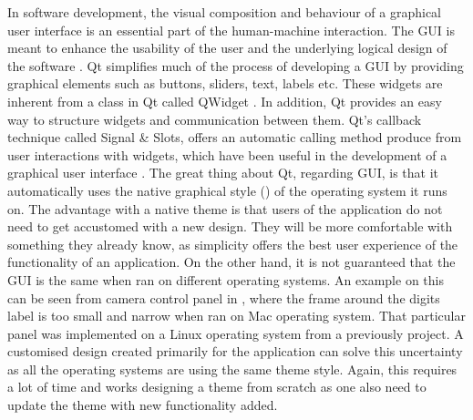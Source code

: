 In software development, the visual composition and behaviour of a graphical user interface is an essential part of the human-machine interaction. The GUI is meant to enhance the usability of the user and the underlying logical design of the software \cite{gui}. Qt simplifies much of the process of developing a GUI by providing graphical elements such as buttons, sliders, text, labels etc. These widgets are inherent from a class in Qt called QWidget \cite{qwidget}. In addition, Qt provides an easy way to structure widgets and communication between them. Qt's callback technique called Signal \& Slots, offers an automatic calling method produce from user interactions with widgets, which have been useful in the development of a graphical user interface \cite{signalslots}. The great thing about Qt, regarding GUI, is that it automatically uses the native graphical style () of the operating system it runs on. The advantage with a native theme is that users of the application do not need to get accustomed with a new design. They will be more comfortable with something they already know, as simplicity offers the best user experience of the functionality of an application. On the other hand, it is not guaranteed that the GUI is the same when ran on different operating systems. An example on this can be seen from camera control panel in , where the frame around the digits label is too small and narrow when ran on Mac operating system. That particular panel was implemented on a Linux operating system from a previously project. A customised design created primarily for the application can solve this uncertainty as all the operating systems are using the same theme style. Again, this requires a lot of time and works designing a theme from scratch as one also need to update the theme with new functionality added.

